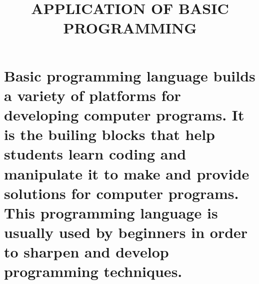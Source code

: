 \documentclass{article}
\begin{document}
\title*{APPLICATION OF BASIC PROGRAMMING}
\section*{Basic programming language builds a variety of platforms for developing computer programs. It is the builing blocks that help students learn coding and manipulate it to make and provide solutions for computer programs.
	This programming language is usually used by beginners in order to sharpen and develop programming techniques.}
\end{document}
